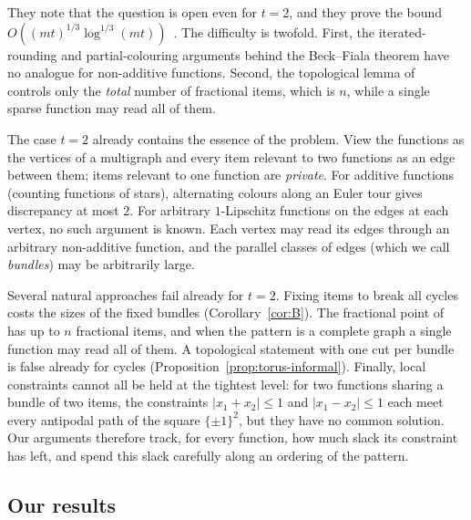 \documentclass[11pt,letterpaper]{article}
\theoremstyle{definition}
\newcommand{\cube}[1]{\{\pm1\}^{#1}}
\begin{document}
They note that the question is open even for $t=2$, and they prove the bound
$O((mt)^{1/3}\log^{1/3}(mt))$~\cite[Theorem~15]{HMMS25}. The difficulty is twofold. First, the
iterated-rounding and partial-colouring arguments behind the Beck--Fiala theorem have no analogue
for non-additive functions. Second, the topological lemma of~\cite{HMMS25} controls only the
\emph{total} number of fractional items, which is $n$, while a single sparse function may read all
of them.

The case $t=2$ already contains the essence of the problem. View the functions as the vertices
of a multigraph and every item relevant to two functions as an edge between them; items relevant
to one function are \emph{private}. For additive functions (counting functions of stars),
alternating colours along an Euler tour gives discrepancy at most $2$. For arbitrary $1$-Lipschitz
functions on the edges at each vertex, no such argument is known. Each vertex may read its edges
through an arbitrary non-additive function, and the parallel classes of edges (which we call
\emph{bundles}) may be arbitrarily large.

Several natural approaches fail already for $t=2$. Fixing items to break all cycles costs the
sizes of the fixed bundles (Corollary~\ref{cor:B}). The fractional point of~\cite{HMMS25} has up to
$n$ fractional items, and when the pattern is a complete graph a single function may read all of
them. A topological statement with one cut per bundle is false already for cycles
(Proposition~\ref{prop:torus-informal}). Finally, local constraints cannot all be held at the
tightest level: for two functions sharing a bundle of two items, the constraints $|x_1+x_2|\le1$
and $|x_1-x_2|\le1$ each meet every antipodal path of the square $\cube2$, but they have no common
solution. Our arguments therefore track, for every function, how much slack its constraint has
left, and spend this slack carefully along an ordering of the pattern.

\subsection{Our results}\label{sec:results}
\end{document}
